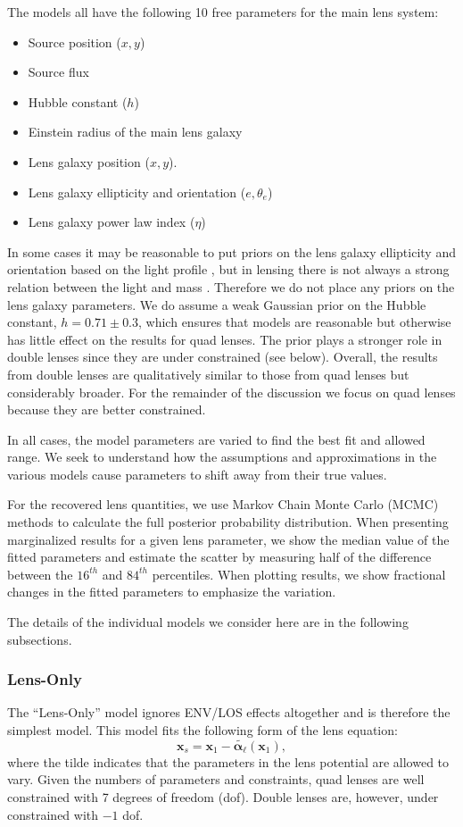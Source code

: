\documentclass{emulateapj}
\newcommand\x[0]{\mathbf{x}}
\newcommand\al[0]{\boldsymbol{\alpha}}
\begin{document}
The models all have the following 10 free parameters for the main lens system:
\begin{itemize}
\item Source position ($x,y$)
\item Source flux
\item Hubble constant ($h$)
\item Einstein radius of the main lens galaxy
\item Lens galaxy position ($x,y$).
\item Lens galaxy ellipticity and orientation ($e,\theta_e$)
\item Lens galaxy power law index ($\eta$)
\end{itemize}


In some cases it may be reasonable to put priors on the lens galaxy ellipticity and orientation based on the light profile \citep[e.g.,][]{Bolton08}, but in lensing there is not always a strong relation between the light and mass \citep[][and references therein]{Bruderer15}. Therefore we do not place any priors on the lens galaxy parameters.  We do assume a weak Gaussian prior on the Hubble constant, $h = 0.71 \pm 0.3$, which ensures that models are reasonable but otherwise has little effect on the results for quad lenses.  The prior plays a stronger role in double lenses since they are under constrained (see below).  Overall, the results from double lenses are qualitatively similar to those from quad lenses but considerably broader. For the remainder of the discussion we focus on quad lenses because they are better constrained.

In all cases, the model parameters are varied to find the best fit and allowed range.  We seek to understand how the assumptions and approximations in the various models cause parameters to shift away from their true values. 

For the recovered lens quantities, we use Markov Chain Monte Carlo (MCMC) methods to calculate the full posterior probability distribution. When presenting marginalized results for a given lens parameter, we show the median value of the fitted parameters and estimate the scatter by measuring half of the difference between the $16^{th}$ and $84^{th}$ percentiles. When plotting results, we show fractional changes in the fitted parameters to emphasize the variation.

The details of the individual models we consider here are in the following subsections.

\subsubsection{Lens-Only}
The ``Lens-Only'' model ignores ENV/LOS effects altogether and is therefore the simplest model. This model fits the following form of the lens equation:
\begin{equation}
\x_s = \x_1 - \tilde{\al_\ell}(\x_1),
\end{equation}
where the tilde indicates that the parameters in the lens potential are allowed to vary.
Given the numbers of parameters and constraints, quad lenses are well constrained with 7 degrees of freedom (dof). Double lenses are, however, under constrained with $-1$ dof.
\end{document}
